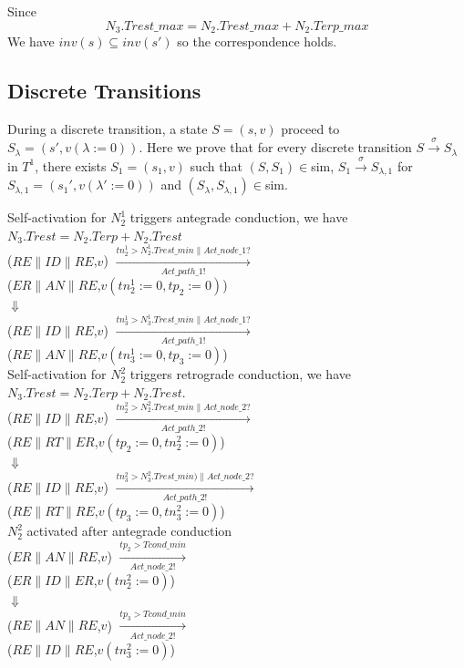 Since $$N_3.Trest\_max = N_2.Trest\_max+N_2.Terp\_max$$
We have $inv(s)\subseteq inv(s')$ so the correspondence holds.\\
\subsection{Discrete Transitions}
During a discrete transition, a state $S=(s,v)$ proceed to $S_\lambda=(s',v(\lambda:=0))$. Here we prove that for every discrete transition $S\xrightarrow{\sigma}S_\lambda$ in $T^1$, there exists $S_1=(s_1,v)$ such that $(S,S_1)\in$\textsf{sim}, $S_1\xrightarrow{\sigma}S_{\lambda,1}$ for $S_{\lambda,1}=(s_1',v(\lambda':=0))$ and $(S_\lambda,S_{\lambda,1})\in$\textsf{sim}.

Self-activation for $N_2^1$ triggers antegrade conduction, we have $N_3.Trest=N_2.Terp+N_2.Trest$\\
($RE\| ID\| RE$,$v$) 
$\xrightarrow[Act\_path\_1!]{tn_2^1>N_2^1.Trest\_min \| Act\_node\_1?}$ \\
($ER\| AN\| RE$,$v(tn_2^1:=0,tp_2:=0)$)\\
$\Downarrow$\\
($RE\| ID\| RE$,$v$) 
$\xrightarrow[Act\_path\_1!]{tn_3^1>N_3^1.Trest\_min\| Act\_node\_1?}$ \\
($RE\| AN\| RE$,$v(tn_3^1:=0,tp_3:=0)$)\\

Self-activation for $N_2^2$ triggers retrograde conduction, we have $N_3.Trest=N_2.Terp+N_2.Trest$.\\
($RE\| ID\| RE$,$v$) 
$\xrightarrow[Act\_path\_2!]{tn_2^2>N_2^2.Trest\_min\| Act\_node\_2?}$ \\
($RE\| RT\| ER$,$v(tp_2:=0,tn_2^2:=0)$)\\
$\Downarrow$\\
($RE\| ID\| RE$,$v$) 
$\xrightarrow[Act\_path\_2!]{tn_3^2>N_3^2.Trest\_min)\| Act\_node\_2?}$ \\
($RE\| RT\| RE$,$v(tp_3:=0,tn_3^2:=0)$)\\

$N_2^2$ activated after antegrade conduction\\
($ER\| AN\| RE$,$v$) 
$\xrightarrow[Act\_node\_2!]{tp_2>Tcond\_min}$ \\
($ER\| ID\| ER$,$v(tn_2^2:=0)$)\\
$\Downarrow$\\
($RE\| AN\| RE$,$v$) 
$\xrightarrow[Act\_node\_2!]{tp_3>Tcond\_min}$ \\
($RE\| ID\| RE$,$v(tn_3^2:=0)$)\\

